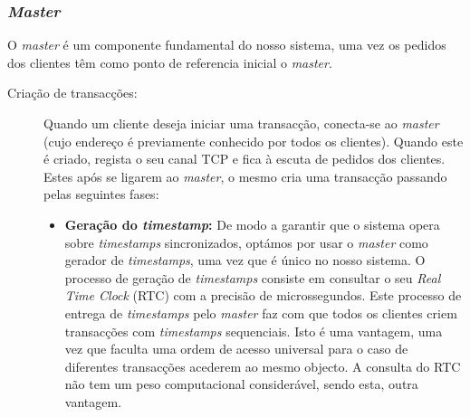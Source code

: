 \subsubsection{\textit{Master}}
O \textit{master} é um componente fundamental do nosso sistema, uma vez os pedidos dos clientes têm como ponto de referencia  inicial o \textit{master}.
\begin{description}

\item[Criação de transacções: ]
 Quando um cliente deseja iniciar uma transacção, conecta-se ao \textit{master} (cujo endereço é previamente conhecido por todos os clientes). Quando este é criado, regista o seu canal TCP e fica à escuta de pedidos dos clientes. Estes após se ligarem ao \textit{master}, o mesmo cria uma transacção passando pelas seguintes fases:
\begin{itemize}

\item \textbf{Geração do \textit{timestamp}:} De modo a  garantir que o sistema opera sobre \textit{timestamps} sincronizados, optámos por usar o \textit{master} como gerador de \textit{timestamps}, uma vez que é único no nosso sistema. O processo de geração de \textit{timestamps} consiste em consultar o seu \textit{Real Time Clock} (RTC) com a precisão de microssegundos. Este processo de entrega de \textit{timestamps} pelo \textit{master} faz com que todos os clientes criem transacções com \textit{timestamps} sequenciais. Isto é uma vantagem, uma vez que faculta uma ordem de acesso universal para o caso de diferentes transacções acederem ao mesmo objecto. A consulta do RTC não tem um peso computacional considerável, sendo esta, outra vantagem.


\end{itemize}
\end{description}
